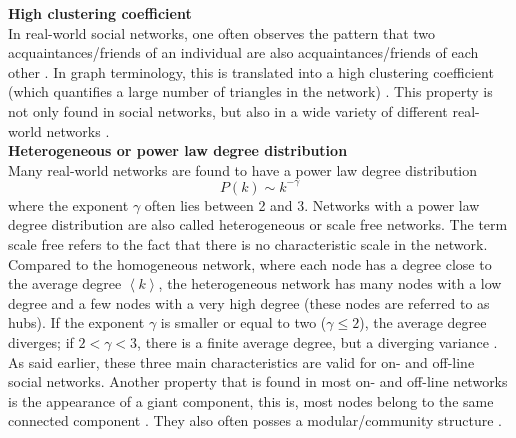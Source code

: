 \documentclass[11 pt , letterpaper , twoside , openright]{book}
\begin{document}
\newline
\textbf{High clustering coefficient}\\
\newline
In real-world social networks, one often observes the pattern that two acquaintances/friends of an individual are also acquaintances/friends of each other \cite{RealWorld}. In graph terminology, this is translated into a high clustering coefficient (which quantifies a large number of triangles in the network) \cite{RealWorld}. This property is not only found in social networks, but also in a wide variety of different real-world networks \cite{RealWorld}.\\
\newline
\textbf{Heterogeneous or power law degree distribution}\\
\newline
Many real-world networks are found to have a power law degree distribution \cite{RealWorld}
\begin{equation}
	P(k) \sim k^{-\gamma}
\end{equation}
where the exponent $\gamma$ often lies between 2 and 3. Networks with a power law degree distribution are also called heterogeneous or scale free networks. The term scale free refers to the fact that there is no characteristic scale in the network. Compared to the homogeneous network, where each node has a degree close to the average degree $\left<k\right>$, the heterogeneous network has many nodes with a low degree and a few nodes with a very high degree (these nodes are referred to as hubs). If the exponent $\gamma$ is smaller or equal to two ($\gamma \leqslant 2$), the average degree diverges; if $2 < \gamma < 3$, there is a finite average degree, but a diverging variance \cite{Newman2005}.\\
\newline
As said earlier, these three main characteristics are valid for on- and off-line social networks. Another property that is found in most on- and off-line networks is the appearance of a giant component, this is, most nodes belong to the same connected component \cite{Latapy}. They also often posses a modular/community structure \cite{Ferrara2012}\cite{McGlohon2011}. \\
\end{document}
